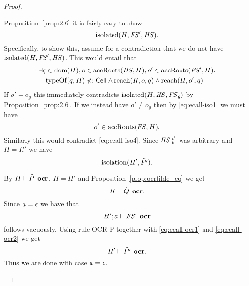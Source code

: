 \begin{proof}
\begin{description}
\begin{description}
          Proposition~\ref{prop:2.6} it is fairly easy to show
          \begin{equation}
            \mbox{$\mathrm{isolated}$}(H, \mathit{FS}', \mathit{HS}).
          \end{equation}
          Specifically, to show this, assume for a contradiction that we do not
          have $\mbox{$\mathrm{isolated}$}(H, \mathit{FS}', \mathit{HS})$. This would entail that
          \begin{equation}
            \begin{aligned}
              \exists q &\in \mbox{$\mathrm{dom}$}(H), o \in \mbox{$\mathrm{accRoots}$}(\mathit{HS}, H), o' \in
              \mbox{$\mathrm{accRoots}$}(\mathit{FS}', H) . \\
              &\mbox{$\mathrm{typeOf}$}(q, H) \not<: \mbox{$\mathsf{Cell}$} \land \mbox{$\mathrm{reach}$}(H, o, q) \land
              \mbox{$\mathrm{reach}$}(H, o', q).
            \end{aligned}
          \end{equation}
          If $o' = o_g$ this immediately contradicts $\mbox{$\mathrm{isolated}$}(H, \mathit{HS}, \mathit{FS}_g)$ by
          Proposition~\ref{prop:2.6}. If we instead have $o' \neq o_g$ then by
          \eqref{eq:ecall-iso1} we must have
          \begin{equation}
            o' \in \mbox{$\mathrm{accRoots}$}(\mathit{FS}, H).
          \end{equation}
          Similarly this would contradict \eqref{eq:ecall-iso4}.  Since
          $\mathit{HS}|_b^{\iota'}$ was arbitrary and $H = H'$ we have 
          \begin{equation}
            \mbox{$\mathrm{isolation}$}(H', \tilde{P'}).
          \end{equation}

          By $H \vdash \tilde{P} \:\: \mbox{\bf ocr}$, $H = H'$ and
          Proposition~\ref{prop:ocrtilde_eq} we get
          \begin{equation} \label{eq:ecall-ocr1}
            H \vdash \tilde{Q} \:\: \mbox{\bf ocr}.
          \end{equation}
          Since $a = \mbox{$\epsilon$}$ we have that 
          \begin{equation} \label{eq:ecall-ocr2}
            H'; a \vdash \mathit{FS}' \:\: \mbox{\bf ocr} 
          \end{equation} 
          follows vacuously. Using rule {\sc OCR-P} together with
          \eqref{eq:ecall-ocr1} and \eqref{eq:ecall-ocr2} we get
          \begin{equation}
            H' \vdash \tilde{P'} \:\: \mbox{\bf ocr}.
          \end{equation}  
          Thus we are done with case $a = \mbox{$\epsilon$}$.
          

\end{description}
\end{description}
\end{proof}
